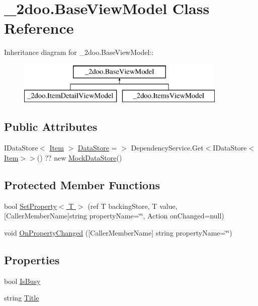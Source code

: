 \hypertarget{class__2doo_1_1_base_view_model}{
\section{\_\-2doo.BaseViewModel Class Reference}
\label{class__2doo_1_1_base_view_model}
}
Inheritance diagram for \_\-2doo.BaseViewModel::\begin{figure}[H]
\begin{center}
\leavevmode
\includegraphics[height=2cm]{class__2doo_1_1_base_view_model}
\end{center}
\end{figure}
\subsection*{Public Attributes}
\begin{CompactItemize}
\item 
IDataStore$<$ \hyperlink{class__2doo_1_1_item}{Item} $>$ \hyperlink{class__2doo_1_1_base_view_model_815111804c4cdcfd99aa3d1d4abe83dc}{DataStore} = $>$ DependencyService.Get$<$IDataStore$<$\hyperlink{class__2doo_1_1_item}{Item}$>$$>$() ?? new \hyperlink{class__2doo_1_1_mock_data_store}{MockDataStore}()
\end{CompactItemize}
\subsection*{Protected Member Functions}
\begin{CompactItemize}
\item 
bool \hyperlink{class__2doo_1_1_base_view_model_7e567a53e0ba559b55afdb3f7abcc5b3}{SetProperty$<$ T $>$} (ref T backingStore, T value,\mbox{[}CallerMemberName\mbox{]}string propertyName=\char`\"{}\char`\"{}, Action onChanged=null)
\item 
void \hyperlink{class__2doo_1_1_base_view_model_cd7a51efc7fd0b8ef1649165eda3d96f}{OnPropertyChanged} (\mbox{[}CallerMemberName\mbox{]} string propertyName=\char`\"{}\char`\"{})
\end{CompactItemize}
\subsection*{Properties}
\begin{CompactItemize}
\item 
bool \hyperlink{class__2doo_1_1_base_view_model_c94a9074f3da1063580a04e1d3cb2dcb}{IsBusy}
\item 
string \hyperlink{class__2doo_1_1_base_view_model_c7a6d8e8fbbf388d1d31864fc7e0f36b}{Title}
\end{CompactItemize}
